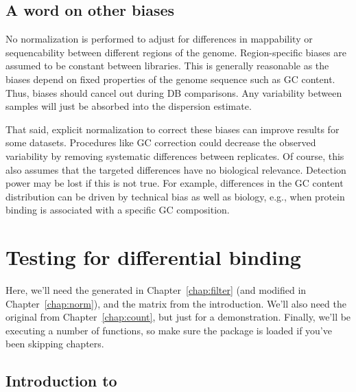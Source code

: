 \documentclass{report}\usepackage[]{graphicx}\usepackage[usenames,dvipsnames]{color}
\newenvironment{combox}
{ \definecolor{shadecolor}{RGB}{255, 240, 240} \begin{shaded}\begin{center}\begin{minipage}[t]{0.95\textwidth} }
{ \end{minipage}\end{center}\end{shaded} \definecolor{shadecolor}{RGB}{240,240,240} }
\begin{document}
\section{A word on other biases}
No normalization is performed to adjust for differences in mappability or sequencability between different regions of the genome. 
Region-specific biases are assumed to be constant between libraries. 
This is generally reasonable as the biases depend on fixed properties of the genome sequence such as GC content. 
Thus, biases should cancel out during DB comparisons.
Any variability between samples will just be absorbed into the dispersion estimate. 

That said, explicit normalization to correct these biases can improve results for some datasets.
Procedures like GC correction could decrease the observed variability by removing systematic differences between replicates. 
Of course, this also assumes that the targeted differences have no biological relevance.
Detection power may be lost if this is not true. 
For example, differences in the GC content distribution can be driven by technical bias as well as biology, e.g., when protein binding is associated with a specific GC composition.




\chapter{Testing for differential binding}
\label{chap:stats}

\begin{combox}
Here, we'll need the  generated in Chapter~\ref{chap:filter} (and modified in Chapter~\ref{chap:norm}), and the  matrix from the introduction.
We'll also need the original  from Chapter~\ref{chap:count}, but just for a demonstration.
Finally, we'll be executing a number of  functions, so make sure the  package is loaded if you've been skipping chapters.
\end{combox}

\section{Introduction to }
\end{document}
